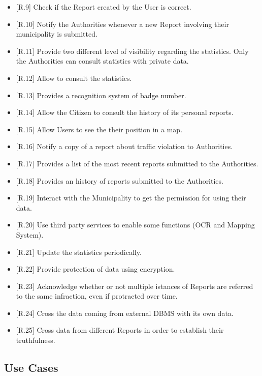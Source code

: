 \documentclass{report}
\begin{document}
\begin{itemize}
	\item {[R.9]} Check if the Report created by the User is correct.
	\item {[R.10]} Notify the Authorities whenever a new Report involving their municipality is submitted. 
	\item {[R.11]} Provide two different level of visibility regarding the statistics. Only the Authorities can consult statistics with private data.
	\item {[R.12]} Allow to consult the statistics.
	\item {[R.13]} Provides a recognition system of badge number.
	\item {[R.14]} Allow the Citizen to consult the history of its personal reports.
	\item {[R.15]} Allow Users to see the their position in a map.
	\item {[R.16]} Notify a copy of a report about traffic violation to Authorities.
	\item {[R.17]} Provides a list of the most recent reports submitted to the Authorities.
	\item {[R.18]} Provides an history of reports submitted to the Authorities.
	\item {[R.19]} Interact with the Municipality to get the permission for using their data.
	\item {[R.20]} Use third party services to enable some functions (OCR and Mapping System).
	\item {[R.21]} Update the statistics periodically.
	\item {[R.22]} Provide protection of data using encryption.
	\item {[R.23]} Acknowledge whether or not multiple istances of Reports are referred to the same infraction, even if protracted over time.
	\item {[R.24]} Cross the data coming from external DBMS with its own data.
	\item {[R.25]} Cross data from different Reports in order to establish their truthfulness.
\end{itemize}

\newpage

\subsection{Use Cases}
\end{document}
